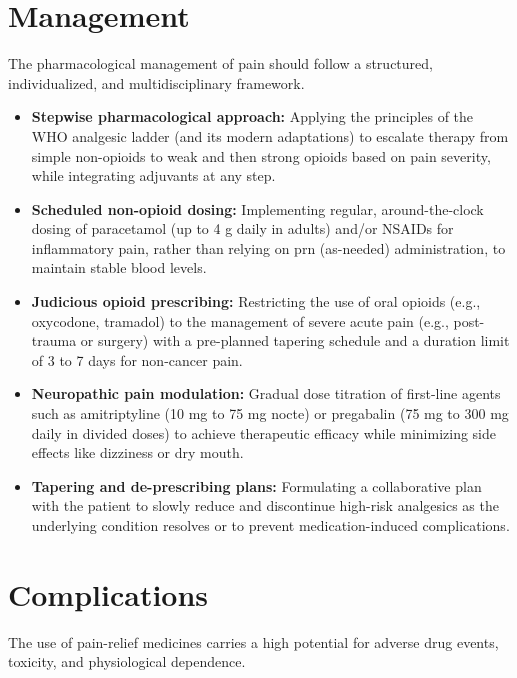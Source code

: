 \section*{Management}
The pharmacological management of pain should follow a structured, individualized, and multidisciplinary framework.

\begin{itemize}
    \item \textbf{Stepwise pharmacological approach:} Applying the principles of the WHO analgesic ladder (and its modern adaptations) to escalate therapy from simple non-opioids to weak and then strong opioids based on pain severity, while integrating adjuvants at any step.
    \item \textbf{Scheduled non-opioid dosing:} Implementing regular, around-the-clock dosing of paracetamol (up to 4 g daily in adults) and/or NSAIDs for inflammatory pain, rather than relying on prn (as-needed) administration, to maintain stable blood levels.
    \item \textbf{Judicious opioid prescribing:} Restricting the use of oral opioids (e.g., oxycodone, tramadol) to the management of severe acute pain (e.g., post-trauma or surgery) with a pre-planned tapering schedule and a duration limit of 3 to 7 days for non-cancer pain.
    \item \textbf{Neuropathic pain modulation:} Gradual dose titration of first-line agents such as amitriptyline (10 mg to 75 mg nocte) or pregabalin (75 mg to 300 mg daily in divided doses) to achieve therapeutic efficacy while minimizing side effects like dizziness or dry mouth.
    \item \textbf{Tapering and de-prescribing plans:} Formulating a collaborative plan with the patient to slowly reduce and discontinue high-risk analgesics as the underlying condition resolves or to prevent medication-induced complications.
\end{itemize}

\section*{Complications}
The use of pain-relief medicines carries a high potential for adverse drug events, toxicity, and physiological dependence.

